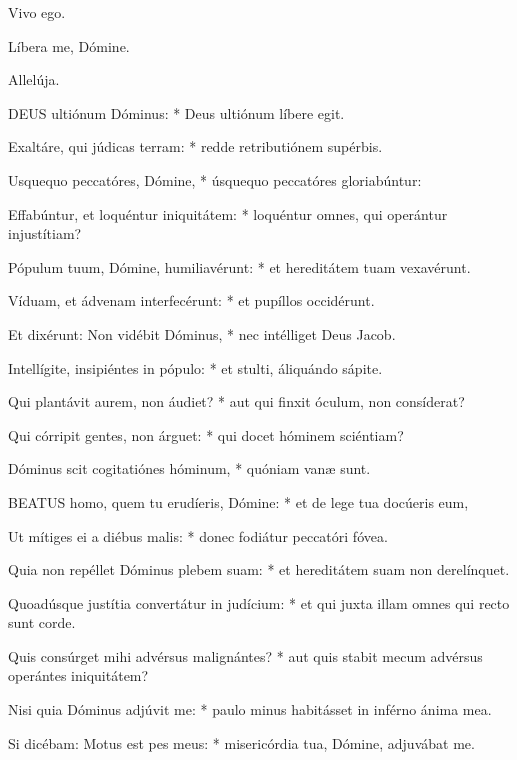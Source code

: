 

 Vivo ego.


 Líbera me, Dómine.

  Allelúja.


\lettrine[lines=2]{D}{EUS} ultiónum Dóminus: * Deus ultiónum líbere egit.

Exaltáre, qui júdicas terram: * redde retributiónem supérbis.

Usquequo peccatóres, Dómine, * úsquequo peccatóres gloriabúntur:

Effabúntur, et loquéntur iniquitátem: * loquéntur omnes, qui operántur injustítiam?

Pópulum tuum, Dómine, humiliavérunt: * et hereditátem tuam vexavérunt.

Víduam, et ádvenam interfecérunt: * et pupíllos occidérunt.

Et dixérunt: Non vidébit Dóminus, * nec intélliget Deus Jacob.

Intellígite, insipiéntes in pópulo: * et stulti, áliquándo sápite.

Qui plantávit aurem, non áudiet? * aut qui finxit óculum, non consíderat?

Qui córripit gentes, non árguet: * qui docet hóminem sciéntiam?

Dóminus scit cogitatiónes hóminum, * quóniam vanæ sunt.


\lettrine[lines=2]{B}{EATUS} homo, quem tu erudíeris, Dómine: * et de lege tua docúeris eum,

Ut mítiges ei a diébus malis: * donec fodiátur peccatóri fóvea.

Quia non repéllet Dóminus plebem suam: * et hereditátem suam non derelínquet.

Quoadúsque justítia convertátur in judícium: * et qui juxta illam omnes qui recto sunt corde.

Quis consúrget mihi advérsus malignántes? * aut quis stabit mecum advérsus operántes iniquitátem?

Nisi quia Dóminus adjúvit me: * paulo minus habitásset in inférno ánima mea.

Si dicébam: Motus est pes meus: * misericórdia tua, Dómine, adjuvábat me.

